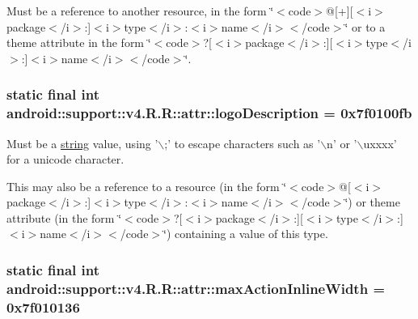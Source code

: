Must be a reference to another resource, in the form \char`\"{}$<$code$>$@\mbox{[}+\mbox{]}\mbox{[}$<$i$>$package$<$/i$>$:\mbox{]}$<$i$>$type$<$/i$>$:$<$i$>$name$<$/i$>$$<$/code$>$\char`\"{} or to a theme attribute in the form \char`\"{}$<$code$>$?\mbox{[}$<$i$>$package$<$/i$>$:\mbox{]}\mbox{[}$<$i$>$type$<$/i$>$:\mbox{]}$<$i$>$name$<$/i$>$$<$/code$>$\char`\"{}. \hypertarget{classandroid_1_1support_1_1v4_1_1_r_1_1attr_5d44ab5ecac0ed28d951e3f052e61232}{
\subsubsection[{logoDescription}]{\setlength{\rightskip}{0pt plus 5cm}static final int android::support::v4.R.R::attr::logoDescription = 0x7f0100fb}}
\label{classandroid_1_1support_1_1v4_1_1_r_1_1attr_5d44ab5ecac0ed28d951e3f052e61232}


Must be a \hyperlink{classandroid_1_1support_1_1v4_1_1_r_1_1string}{string} value, using '$\backslash$;' to escape characters such as '$\backslash$n' or '$\backslash$uxxxx' for a unicode character. 

This may also be a reference to a resource (in the form \char`\"{}$<$code$>$@\mbox{[}$<$i$>$package$<$/i$>$:\mbox{]}$<$i$>$type$<$/i$>$:$<$i$>$name$<$/i$>$$<$/code$>$\char`\"{}) or theme attribute (in the form \char`\"{}$<$code$>$?\mbox{[}$<$i$>$package$<$/i$>$:\mbox{]}\mbox{[}$<$i$>$type$<$/i$>$:\mbox{]}$<$i$>$name$<$/i$>$$<$/code$>$\char`\"{}) containing a value of this type. \hypertarget{classandroid_1_1support_1_1v4_1_1_r_1_1attr_4eca41424959a7265e7ca6f821863f59}{
\subsubsection[{maxActionInlineWidth}]{\setlength{\rightskip}{0pt plus 5cm}static final int android::support::v4.R.R::attr::maxActionInlineWidth = 0x7f010136}}
\label{classandroid_1_1support_1_1v4_1_1_r_1_1attr_4eca41424959a7265e7ca6f821863f59}


